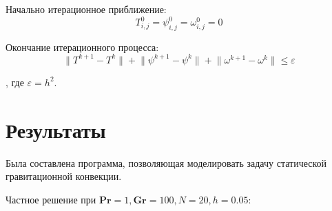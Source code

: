 \documentclass[a4paper, 12pt]{article}
\newcommand{\Pra}{\mathbf{Pr}}
\newcommand{\Gra}{\mathbf{Gr}}
\begin{document}
    Начально итерационное приближение:
    $$
      T_{i,j}^0 = \psi_{i,j}^{0} = \omega_{i,j}^{0} = 0
    $$

    Окончание итерационного процесса:
    $$
      \lVert T^{k+1} - T^k \rVert + 
      \lVert \psi^{k+1} - \psi^k \rVert +
      \lVert \omega^{k+1} - \omega^k \rVert 
      \leq \varepsilon
    $$

    , где $\varepsilon = h^2$.
  \pagebreak

  \section{Результаты}
    Была составлена программа, позволяющая моделировать задачу статической
    гравитационной конвекции.

    \bigskip
    Частное решение при $\Pra = 1, \Gra = 100, N = 20, h = 0.05$:
    \bigskip
\end{document}
